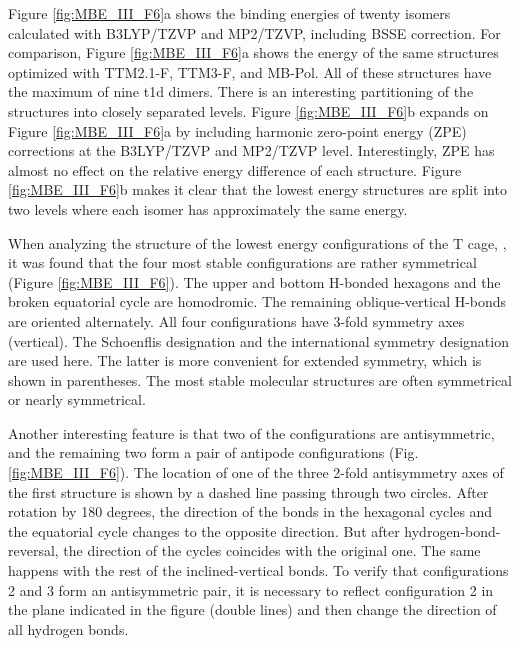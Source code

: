 \documentclass[11pt, proquest]{uwthesis}[2020/02/24]
\let\ce\ch
\begin{document}
\par Figure \ref{fig:MBE_III_F6}a shows the binding energies of twenty \ce{(H2O)_{24}} isomers calculated with B3LYP/TZVP and MP2/TZVP, including BSSE correction. For comparison, Figure \ref{fig:MBE_III_F6}a shows the energy of the same structures optimized with TTM2.1-F, TTM3-F\autocite{fanourgakis_development_2008}, and MB-Pol. All of these structures have the maximum of nine t1d dimers. There is an interesting partitioning of the structures into closely separated levels. Figure \ref{fig:MBE_III_F6}b expands on Figure \ref{fig:MBE_III_F6}a by including harmonic zero-point energy (ZPE) corrections at the B3LYP/TZVP and MP2/TZVP level. Interestingly, ZPE has almost no effect on the relative energy difference of each structure. Figure \ref{fig:MBE_III_F6}b makes it clear that the lowest energy structures are split into two levels where each isomer has approximately the same energy.



\par When analyzing the structure of the lowest energy configurations of the T cage, \ce{(H2O)_{24}}, it was found that the four most stable configurations are rather symmetrical (Figure \ref{fig:MBE_III_F6}). The upper and bottom H-bonded hexagons and the broken equatorial cycle are homodromic. The remaining oblique-vertical H-bonds are oriented alternately. All four configurations have 3-fold symmetry axes (vertical). The Schoenflis designation and the international symmetry designation are used here. The latter is more convenient for extended symmetry, which is shown in parentheses. The most stable molecular structures are often symmetrical or nearly symmetrical\autocite{wales_symmetry_1998}.

\par Another interesting feature is that two of the \ce{(H2O)_{24}} configurations are antisymmetric, and the remaining two form a pair of antipode configurations (Fig. \ref{fig:MBE_III_F6}). The location of one of the three 2-fold antisymmetry axes of the first structure is shown by a dashed line passing through two circles. After rotation by 180 degrees, the direction of the bonds in the hexagonal cycles and the equatorial cycle changes to the opposite direction. But after hydrogen-bond-reversal, the direction of the cycles coincides with the original one. The same happens with the rest of the inclined-vertical bonds. To verify that configurations 2 and 3 form an antisymmetric pair, it is necessary to reflect configuration 2 in the plane indicated in the figure (double lines) and then change the direction of all hydrogen bonds.
\end{document}
